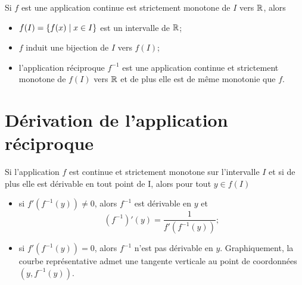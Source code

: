 \begin{theo}
  Si \(f\) est une application continue est strictement monotone de \(I\) vers 
  \(\mathbb{R}\), alors
  \begin{itemize}
    \item \(f(I)=\left\{f(x)\mathrel{}\middle|\mathrel{}x \in I\right\}\) est un intervalle de \(\mathbb{R}\);
    \item \(f\) induit une bijection de \(I\) vers \(f(I)\);
    \item l'application réciproque \(f^{-1}\) est une application continue et 
      strictement monotone de \(f(I)\) vers \(\mathbb{R}\) et de plus elle est de même 
      monotonie que \(f\).
  \end{itemize}
\end{theo}

\section{Dérivation de l'application réciproque}

\begin{theo}
  Si l'application \(f\) est continue et strictement monotone sur l'intervalle 
  \(I\) et si de plus elle est dérivable en tout point de I, alors pour tout \(y 
  \in f(I)\)
  \begin{itemize}
    \item si \(f'(f^{-1}(y)) \neq 0\), alors \(f^{-1}\) est dérivable en \(y\) 
      et
      \begin{equation}
        \left(f^{-1} \right)'(y)=\frac{1}{f'\left(f^{-1}(y)\right)};
      \end{equation}
    \item si \(f'(f^{-1}(y)) = 0\), alors \(f^{-1}\) n'est pas dérivable en 
      \(y\). Graphiquement, la courbe représentative admet une tangente 
      verticale au point de coordonnées \((y,f^{-1}(y))\).
  \end{itemize}
\end{theo}
